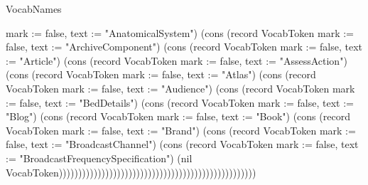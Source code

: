 \begin{lexlean}{VocabNames}
\begin{semanticmodule}
{{mark := false, text := "AnatomicalSystem"}) (cons (record VocabToken {mark := false, text := "ArchiveComponent"}) (cons (record VocabToken {mark := false, text := "Article"}) (cons (record VocabToken {mark := false, text := "AssessAction"}) (cons (record VocabToken {mark := false, text := "Atlas"}) (cons (record VocabToken {mark := false, text := "Audience"}) (cons (record VocabToken {mark := false, text := "BedDetails"}) (cons (record VocabToken {mark := false, text := "Blog"}) (cons (record VocabToken {mark := false, text := "Book"}) (cons (record VocabToken {mark := false, text := "Brand"}) (cons (record VocabToken {mark := false, text := "BroadcastChannel"}) (cons (record VocabToken {mark := false, text := "BroadcastFrequencySpecification"}) (nil VocabToken)))))))))))))))))))))))))))))))))))))))))))))))))))
}


\end{semanticmodule}
\end{lexlean}
